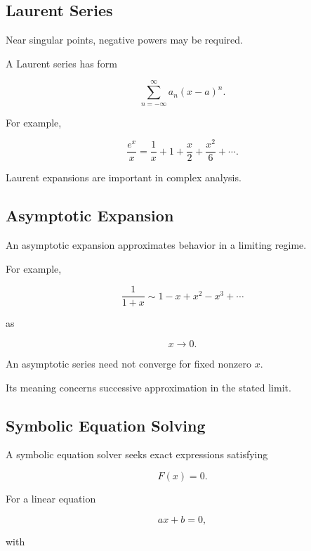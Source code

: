 \subsection{Laurent Series}
\label{subsec:symbolic-laurent-series}

Near singular points, negative powers may be required.

A Laurent series has form

\[
\boxed{
\sum_{n=-\infty}^{\infty}
a_n
(x-a)^n.
}
\]

For example,

\[
\boxed{
\frac{e^x}{x}
=
\frac1x
+
1
+
\frac{x}{2}
+
\frac{x^2}{6}
+
\cdots.
}
\]

Laurent expansions are important in complex analysis.

\subsection{Asymptotic Expansion}
\label{subsec:symbolic-asymptotic-expansion}

An asymptotic expansion approximates behavior in a limiting regime.

For example,

\[
\boxed{
\frac1{1+x}
\sim
1-x+x^2-x^3+\cdots
}
\]

as

\[
x\to0.
\]

An asymptotic series need not converge for fixed nonzero \(x\).

Its meaning concerns successive approximation in the stated limit.

\subsection{Symbolic Equation Solving}
\label{subsec:symbolic-equation-solving}

A symbolic equation solver seeks exact expressions satisfying

\[
\boxed{
F(x)=0.
}
\]

For a linear equation

\[
ax+b=0,
\]

with

